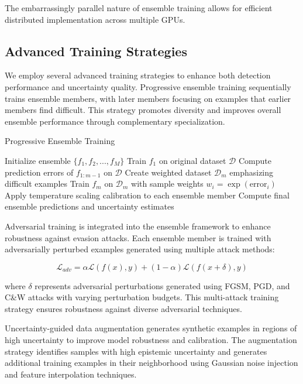 \documentclass[journal]{IEEEtran}
\begin{document}
The embarrassingly parallel nature of ensemble training allows for efficient distributed implementation across multiple GPUs.

\subsection{Advanced Training Strategies}

We employ several advanced training strategies to enhance both detection performance and uncertainty quality. Progressive ensemble training sequentially trains ensemble members, with later members focusing on examples that earlier members find difficult. This strategy promotes diversity and improves overall ensemble performance through complementary specialization.

\begin{algorithm}[t]
\caption{Progressive Ensemble Training}
\begin{algorithmic}[1]
\STATE Initialize ensemble $\{f_1, f_2, ..., f_M\}$
        \STATE Train $f_1$ on original dataset $\mathcal{D}$
    \ELSE
        \STATE Compute prediction errors of $f_{1:m-1}$ on $\mathcal{D}$
        \STATE Create weighted dataset $\mathcal{D}_m$ emphasizing difficult examples
        \STATE Train $f_m$ on $\mathcal{D}_m$ with sample weights $w_i = \exp(\text{error}_i)$
    \ENDIF
\ENDFOR
\STATE Apply temperature scaling calibration to each ensemble member
\STATE Compute final ensemble predictions and uncertainty estimates
\end{algorithmic}
\end{algorithm}

Adversarial training is integrated into the ensemble framework to enhance robustness against evasion attacks. Each ensemble member is trained with adversarially perturbed examples generated using multiple attack methods:

\begin{equation}
\mathcal{L}_{adv} = \alpha \mathcal{L}(f(x), y) + (1-\alpha) \mathcal{L}(f(x + \delta), y)
\end{equation}

where $\delta$ represents adversarial perturbations generated using FGSM, PGD, and C\&W attacks with varying perturbation budgets. This multi-attack training strategy ensures robustness against diverse adversarial techniques.

Uncertainty-guided data augmentation generates synthetic examples in regions of high uncertainty to improve model robustness and calibration. The augmentation strategy identifies samples with high epistemic uncertainty and generates additional training examples in their neighborhood using Gaussian noise injection and feature interpolation techniques.
\end{document}

